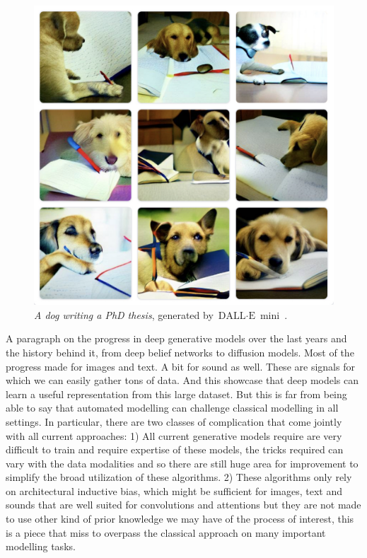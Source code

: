 \begin{figure}
  \centering
  \includegraphics[width=.8\textwidth]{figures/chapter01/dog_phd_thesis.jpeg}
  \caption{\textit{A dog writing a PhD thesis}, generated by $\text{DALL}\cdot\text{E}$ mini~\citep{Dayma_DALL_E_Mini_2021}.}
  \label{fig:dalle-mini}
\end{figure}

A paragraph on the progress in deep generative models over the last years and the history behind it, from deep belief networks to diffusion models. Most of the progress
made for images and text. A bit for sound as well. These are signals for which we can easily gather tons of data. And this showcase that deep models can learn a useful representation from this large dataset. But this is far from being able to say that automated modelling can challenge classical modelling in all settings. In particular, there are two classes of complication that come jointly with all current approaches: 1) All current generative models require are very difficult to train and require expertise of these models, the tricks required can vary with the data modalities and so there are still huge area for improvement to simplify the broad utilization of these algorithms. 2) These algorithms only rely on architectural inductive bias, which might be sufficient for images, text and sounds that are well suited for convolutions and attentions but they are not made to use other kind of prior knowledge we may have of the process of interest, this is a piece that miss to overpass the classical approach on many important modelling tasks.

